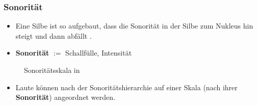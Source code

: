 \begin{frame}
\frametitle{Sonorität}

\begin{itemize}
	\item Eine Silbe ist so aufgebaut, dass die Sonorität in der Silbe zum Nukleus hin steigt und dann abfällt \citep[vgl.][93]{Ramers08a}.

	\item \textbf{Sonorität} $:=$ Schallfülle, Intensität

\end{itemize}

\begin{figure}
	\centering
	\caption{Sonoritätsskala in \citet[19]{Lenerz85a}} %
\end{figure}

\begin{itemize}
	\item Laute können nach der Sonoritätshierarchie auf einer Skala (nach ihrer \textbf{Sonorität}) angeordnet werden.
\end{itemize}

\end{frame}


